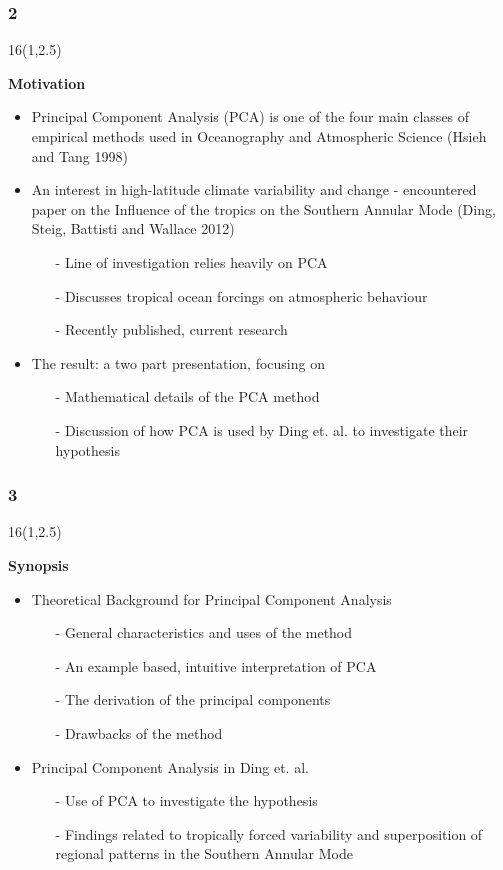\documentclass{beamer}
\newcommand\FrameText[1]{
\begin{textblock}{16}(1,2.5)
\raggedright #1
\end{textblock}}
\begin{document}
\begin{frame}
\frametitle{2}
\FrameText{\bf{\large Motivation}}
\begin{itemize}
\item Principal Component Analysis (PCA) is one of the four main classes of empirical methods used in Oceanography and Atmospheric Science (Hsieh and Tang 1998)~\cite{hsi}
\item An interest in high-latitude climate variability and change - encountered paper on the Influence of the tropics on the Southern Annular Mode (Ding, Steig, Battisti and Wallace 2012)~\cite{din}
\begin{itemize}
\scriptsize
\item[-] Line of investigation relies heavily on PCA
\item[-] Discusses tropical ocean forcings on atmospheric behaviour
\item[-] Recently published, current research
\end{itemize}
\item The result: a two part presentation, focusing on
\begin{itemize}
\scriptsize
\item[-] Mathematical details of the PCA method
\item[-] Discussion of how PCA is used by Ding et. al. to investigate their hypothesis
\end{itemize}
\end{itemize}
\end{frame}

\begin{frame}
\frametitle{3}
\FrameText{\bf{\large Synopsis}}
\begin{itemize}
\item Theoretical Background for Principal Component Analysis
\begin{itemize}
\scriptsize
\normalfont
\item[-] General characteristics and uses of the method
\item[-] An example based, intuitive interpretation of PCA
\item[-] The derivation of the principal components
\item[-] Drawbacks of the method
\end{itemize}
\footnotesize
\item Principal Component Analysis in Ding et. al.
\begin{itemize}
\normalfont
\scriptsize
\item[-] Use of PCA to investigate the hypothesis
\item[-] Findings related to tropically forced variability and superposition of regional patterns in the Southern Annular Mode
\end{itemize}
\end{itemize}
\end{frame}
\end{document}
